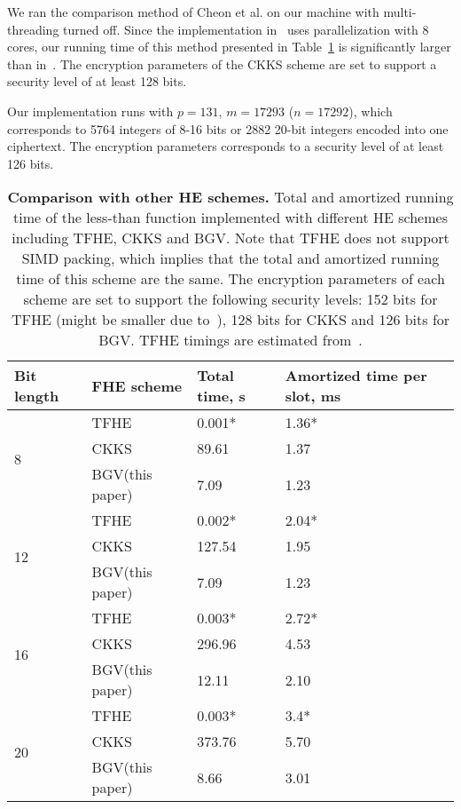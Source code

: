     We ran the comparison method of Cheon et al. on our machine with multi-threading turned off. 
    Since the implementation in~\cite{EPRINT:CheKimKim19} uses parallelization with 8 cores, our running time of this method presented in Table~\ref{table:other_he_schemes} is significantly larger than in~\cite{EPRINT:CheKimKim19}.
    The encryption parameters of the CKKS scheme are set to support a security level of at least 128 bits.

    Our implementation runs with $p=131$, $m=17293$ ($n=17292$), which corresponds to 5764 integers of 8-16 bits or 2882 20-bit integers encoded into one ciphertext.
    The encryption parameters corresponds to a security level of at least 126 bits.

    \begin{table}[h]
      \centering
      \begin{tabular*}{.45\textwidth}{ p{1.2cm} p{2.1cm} p{1.0cm} p{2cm}}
        \toprule
        Bit length  & FHE scheme & Total time, s    & Amortized time per slot, ms \\
        \midrule
        \multirow{3}{*}{8}  & TFHE              & 0.001*     & 1.36* \\
                            & CKKS              & 89.61     & 1.37 \\
                            & BGV(this paper)   & 7.09      & 1.23 \\
        \midrule
        \multirow{3}{*}{12}  & TFHE             & 0.002*     & 2.04* \\
                             & CKKS             & 127.54    & 1.95 \\
                             & BGV(this paper)  & 7.09      & 1.23 \\
        \midrule
        \multirow{3}{*}{16}  & TFHE            & 0.003*     & 2.72* \\
                             & CKKS            & 296.96     & 4.53 \\
                             & BGV(this paper)  & 12.11      & 2.10 \\
        \midrule
        \multirow{3}{*}{20}  & TFHE            & 0.003*      & 3.4* \\
                             & CKKS            & 373.76     & 5.70 \\
                             & BGV(this paper)   & 8.66     &  3.01\\ 
        \bottomrule
      \end{tabular*}
      \caption{\textbf{Comparison with other HE schemes.} Total and amortized running time of the less-than function implemented with different HE schemes including TFHE, CKKS and BGV. Note that TFHE does not support SIMD packing, which implies that the total and amortized running time of this scheme are the same. The encryption parameters of each scheme are set to support the following security levels: 152 bits for TFHE (might be smaller due to~\cite{EPRINT:EJK20}), 128 bits for CKKS and 126 bits for BGV.
      \newline *TFHE timings are estimated from~\cite{JC:CGGI20}.}
      \label{table:other_he_schemes}
    \end{table}
    
